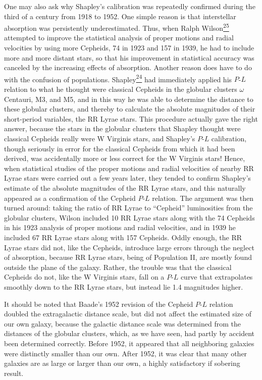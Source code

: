One may also ask why Shapley's calibration was repeatedly confirmed during
the third of a century from 1918 to 1952. One simple reason is that
interstellar absorption was persistently underestimated. Thus, when Ralph
Wilson\hyperref[ch14-ref-25]{\textsuperscript{25}} attempted to improve the
statistical analysis of proper motions and radial velocities by using more
Cepheids, 74 in 1923 and 157 in 1939, he had to include more and more distant
stars, so that his improvement in statistical accuracy was canceled by the
increasing effects of absorption. Another reason does have to do with the
confusion of populations. Shapley\hyperref[ch14-ref-24]{\textsuperscript{24}}
had immediately applied his \(P\)-\(L\) relation to what he thought were
classical Cepheids in the globular clusters \(\omega\) Centauri, M3, and M5,
and in this way he was able to determine the distance to these globular
clusters, and thereby to calculate the absolute magnitudes of their
short-period variables, the RR Lyrae stars. This procedure actually gave the
right answer, because the stars in the globular clusters that Shapley thought
were classical Cepheids really were W Virginis stars, and Shapley's
\(P\)-\(L\) calibration, though seriously in error for the classical
Cepheids from which it had been derived, was accidentally more or less
correct for the W Virginis stars! Hence, when statistical studies of the
proper motions and radial velocities of nearby RR Lyrae stars were carried
out a few years later, they tended to confirm Shapley's estimate of the
absolute magnitudes of the RR Lyrae stars, and this naturally appeared as a
confirmation of the Cepheid \(P\)-\(L\) relation. The argument was then
turned around: taking the ratio of RR Lyrae to ``Cepheid'' luminosities from
the globular clusters, Wilson included 10 RR Lyrae stars along with the 74
Cepheids in his 1923 analysis of proper motions and radial velocities, and
in 1939 he included 67 RR Lyrae stars along with 157 Cepheids. Oddly enough,
the RR Lyrae stars did not, like the Cepheids, introduce large errors through
the neglect of absorption, because RR Lyrae stars, being of Population II,
are mostly found outside the plane of the galaxy. Rather, the trouble was
that the classical Cepheids do not, like the W Virginis stars, fall on a
\(P\)-\(L\) curve that extrapolates smoothly down to the RR Lyrae stars,
but instead lie 1.4 magnitudes higher.

It should be noted that Baade's 1952 revision of the Cepheid \(P\)-\(L\)
relation doubled the extragalactic distance scale, but did not affect the
estimated size of our own galaxy, because the galactic distance scale was
determined from the distances of the globular clusters, which, as we have
seen, had partly by accident been determined correctly. Before 1952, it
appeared that all neighboring galaxies were distinctly smaller than our
own. After 1952, it was clear that many other galaxies are as large or larger
than our own, a highly satisfactory if sobering result.

